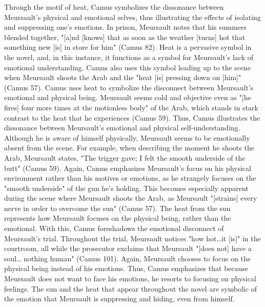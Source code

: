\documentclass[12pt,a4paper]{article}
\begin{document}
    Through the motif of heat, Camus symbolizes the dissonance between
    Meursault's physical and emotional selves, thus illustrating the effects
    of isolating and suppressing one's emotions. In prison, Meursault notes
    that his summers blended together, "[a]nd [knows] that as soon as the
    weather [turns] hot that something new [is] in store for him" (Camus
    82). Heat is a pervasive symbol in the novel, and, in this instance, it
    functions as a symbol for Meursault's lack of emotional understanding.
    Camus also uses this symbol leading up to the scene when Meursault
    shoots the Arab and the "heat [is] pressing down on [him]" (Camus 57).
    Camus uses heat to symbolize the disconnect between Meursault's
    emotional and physical being. Meursault seems cold and objective even as
    "[he fires] four more times at the motionless body" of the Arab, which
    stands in stark contrast to the heat that he experiences (Camus 59).
    Thus, Camus illustrates the dissonance between Meursault's emotional and
    physical self-understanding. Although he is aware of himself physically,
    Meursault seems to be emotionally absent from the scene. For example,
    when describing the moment he shoots the Arab, Meursault states, "The
    trigger gave; I felt the smooth underside of the butt" (Camus 59).
    Again, Camus emphasizes Meursault's focus on his physical environment
    rather than his motives or emotions, as he strangely focuses on the
    "smooth underside" of the gun he's holding. This becomes especially
    apparent during the scene where Meursault shoots the Arab, as Meursault
    "[strains] every nerve in order to overcome the sun" (Camus 57). The
    heat from the sun represents how Meursault focuses on the physical
    being, rather than the emotional. With this, Camus foreshadows the
    emotional disconnect of Meursault's trial. Throughout the trial,
    Meursault notices "how hot…it [is]" in the courtroom, all while the
    prosecutor exclaims that Meursault "[does not] have a soul… nothing
    human" (Camus 101). Again, Meursault chooses to focus on the physical
    being instead of his emotions. Thus, Camus emphasizes that because
    Meursault does not want to face his emotions, he resorts to focusing on
    physical feelings. The sun and the heat that appear throughout the novel
    are symbolic of the emotion that Meursault is suppressing and hiding,
    even from himself. \\
\end{document}
